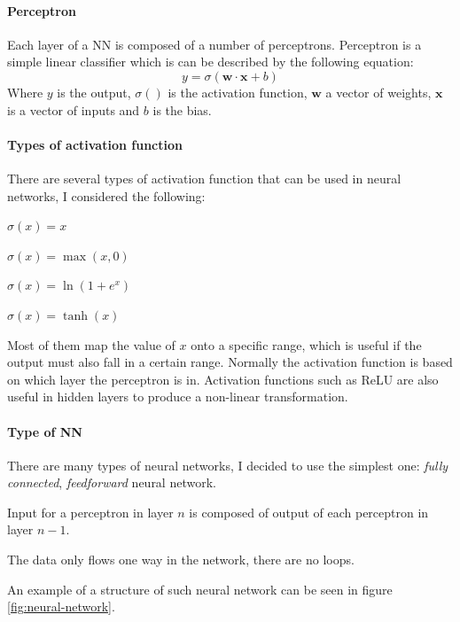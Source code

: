 \documentclass[12pt,a4paper]{book}
\newcommand\bs[1]{\boldsymbol{#1}}
\begin{document}
\paragraph{Perceptron}
Each layer of a NN is composed of a number of perceptrons.
Perceptron is a simple linear classifier which is can be described by the following equation:
\begin{equation*}
y = \sigma(\bs{w\cdot x}+b)
\end{equation*}
Where $y$ is the output, $\sigma()$ is the activation function, $\bs{w}$ a vector of weights, $\bs{x}$ is a vector of inputs and $b$ is the bias.

\paragraph{Types of activation function}
There are several types of activation function that can be used in neural networks, I considered the following:
\begin{description}[labelwidth=\widthof{\bfseries Rectified Linear Unit (ReLU) }]
\item[Identity] $\sigma(x) = x$
\item[Rectified Linear Unit (ReLU)] $\sigma(x) = \max(x,0)$
\item[Softplus] $\sigma(x) = \ln(1+e^x)$
\item[TanH] $\sigma(x) = \tanh(x)$
\end{description}
Most of them map the value of $x$ onto a specific range, which is useful if the output must also fall in a certain range.
Normally the activation function is based on which layer the perceptron is in.
Activation functions such as ReLU are also useful in hidden layers to produce a non-linear transformation.

\paragraph{Type of NN}
There are many types of neural networks, I decided to use the simplest one: \emph{fully connected}, \emph{feedforward} neural network.
\begin{description}[labelwidth=\widthof{\bfseries Fully connected }]
\item[Fully connected] Input for a perceptron in layer $n$ is composed of output of each perceptron in layer $n-1$.
\item[Feedforward] The data only flows one way in the network, there are no loops.
\end{description}
An example of a structure of such neural network can be seen in figure \ref{fig:neural-network}.
\end{document}

